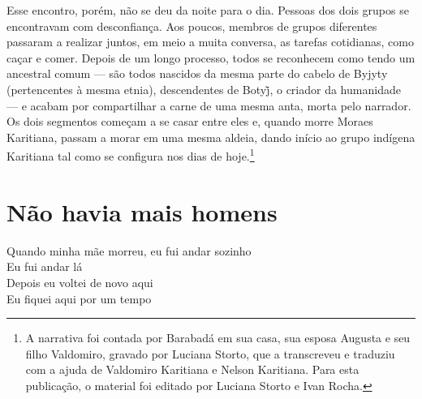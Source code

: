 
Esse encontro, porém, não se deu da noite para o dia. Pessoas dos dois grupos se encontravam com desconfiança. Aos poucos, membros de grupos diferentes passaram a realizar juntos, em meio a muita conversa, as tarefas cotidianas, como caçar e comer. Depois de um longo processo, todos se reconhecem como tendo um ancestral comum --- são todos nascidos da mesma parte do cabelo de Byjyty (pertencentes à mesma etnia), descendentes de Botyj̃, o criador da humanidade --- e acabam por compartilhar a carne de uma mesma anta, morta pelo narrador. Os dois segmentos começam a se casar entre eles e, quando morre Moraes Karitiana, passam a morar em uma mesma aldeia, dando início ao grupo indígena Karitiana tal como se configura nos dias de hoje.\footnote{A narrativa foi contada por Barabadá em sua casa, sua esposa Augusta e
seu filho Valdomiro, gravado por Luciana Storto, que a transcreveu e
traduziu com a ajuda de Valdomiro Karitiana e Nelson Karitiana. Para
esta publicação, o material foi editado por Luciana Storto e Ivan Rocha.}

\vspace*{\fill}

 \chapter{Não havia mais homens}
 

\begin{linenumbers}\begingroup\raggedright
  \noindent Quando minha mãe morreu, eu fui andar sozinho\\
  Eu fui andar lá\\
  Depois eu voltei de novo aqui\\
  Eu fiquei aqui por um tempo
 
\end{linenumbers}\endgroup

\bigskip


